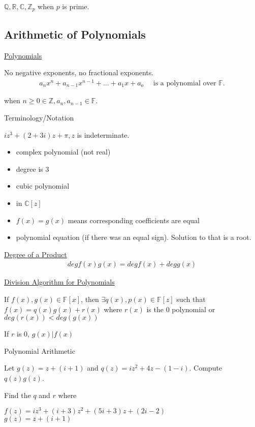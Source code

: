 \documentclass{article}
\begin{document}
$\mathbb{Q}, \mathbb{R}, \mathbb{C}, \mathbb{Z}_p$ when $p$ is prime. 

\subsection{Arithmetic of Polynomials}

\underline{Polynomials}

No negative exponents, no fractional exponents. 
\begin{align*}
    a_nx^n + a_{n-1}x^{n-1}+\ldots + a_1x+a_o \quad \text{ is a polynomial over } \mathbb{F}.
\end{align*}

when $n \ge 0 \in \mathbb{Z}, a_n,a_{n-1} \in \mathbb{F}$.

Terminology/Notation

$iz^3 + (2+3i)z + \pi, z$ is indeterminate.

\begin{itemize}
    \item complex polynomial (not real)
    \item degree is $3$
    \item cubic polynomial
    \item in $\mathbb{C}[z]$
    \item $f(x)=g(x)$ means corresponding coefficients are equal
    \item polynomial equation (if there was an equal sign). Solution to that is a root.
\end{itemize}

\underline{Degree of a Product}
\begin{align*}
    degf(x)g(x) = degf(x) + degg(x)
\end{align*}

\underline{Division Algorithm for Polynomials}

If $f(x),g(x) \in \mathbb{F}[x]$, then $\exists q(x), p(x) \in \mathbb{F}[z]$ such that $f(x) =q(x)g(x) + r(x)$ where $r(x)$ is the 0 polynomial or $deg(r(x)) < deg(g(x))$

If $r$ is 0, $g(x) \vert f(x)$

Polynomial Arithmetic

Let $g(z) = z + (i + 1)$ and $q(z) = iz^2 + 4z - (1-i)$. Compute $q(z)g(z)$.

Find the $q$ and $r$ where

$f(z) = iz^3 + (i+3)z^2 + (5i+3)z + (2i-2)$\\
$g(z) = z + (i + 1)$
\end{document}
